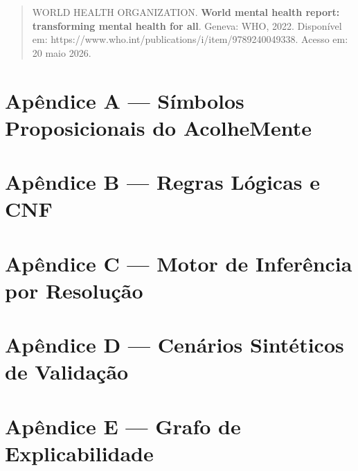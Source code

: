 \documentclass[11pt]{article}
\begin{document}
\begin{quote}
WORLD HEALTH ORGANIZATION. \textbf{World mental health report:
transforming mental health for all}. Geneva: WHO, 2022. Disponível em:
https://www.who.int/publications/i/item/9789240049338. Acesso em: 20
maio 2026.
\end{quote}

    \newpage
\makeatletter
\renewcommand{\@chapapp}{Apêndice}
\makeatother

\clearpage
\appendix

\section*{Apêndice A --- Símbolos Proposicionais do AcolheMente}


\section*{Apêndice B --- Regras Lógicas e CNF}


\section*{Apêndice C --- Motor de Inferência por Resolução}


\section*{Apêndice D --- Cenários Sintéticos de Validação}


\section*{Apêndice E --- Grafo de Explicabilidade}

\end{document}
